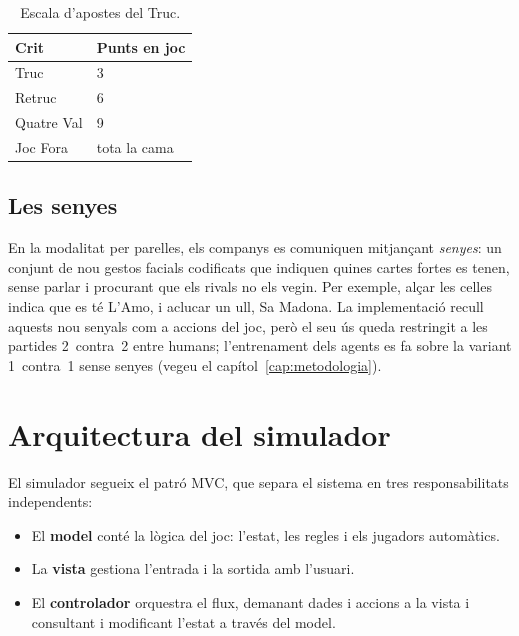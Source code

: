 \begin{table}[H]
  \centering
  \begin{tabular}{ll}
    \toprule
    Crit       & Punts en joc \\
    \midrule
    Truc       & 3 \\
    Retruc     & 6 \\
    Quatre Val & 9 \\
    Joc Fora   & tota la cama \\
    \bottomrule
  \end{tabular}
  \caption{Escala d'apostes del Truc.}
  \label{tab:truc}
\end{table}

\subsection*{Les senyes}

En la modalitat per parelles, els companys es comuniquen mitjançant \emph{senyes}:
un conjunt de nou gestos facials codificats que indiquen quines cartes fortes es
tenen, sense parlar i procurant que els rivals no els vegin. Per exemple, alçar les
celles indica que es té L'Amo, i aclucar un ull, Sa Madona. La implementació recull
aquests nou senyals com a accions del joc, però el seu ús queda restringit a les
partides 2~contra~2 entre humans; l'entrenament dels agents es fa sobre la variant
1~contra~1 sense senyes (vegeu el capítol~\ref{cap:metodologia}).

\section{Arquitectura del simulador}
\label{sec:mvc}

El simulador segueix el patró \ac{MVC}, que separa el sistema en tres
responsabilitats independents:

\begin{itemize}
  \item El \textbf{model} conté la lògica del joc: l'estat, les regles i els
        jugadors automàtics.
  \item La \textbf{vista} gestiona l'entrada i la sortida amb l'usuari.
  \item El \textbf{controlador} orquestra el flux, demanant dades i accions a la
        vista i consultant i modificant l'estat a través del model.
\end{itemize}

